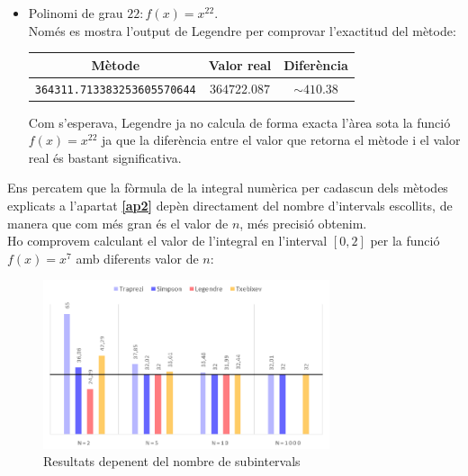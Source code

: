 \documentclass[12pt]{article}
\begin{document}
\begin{itemize}
     \item Polinomi de grau $22: f(x) = x^{22}$.\\
    Només es mostra l'output de Legendre per comprovar l'exactitud del mètode:
    
    \begin{table}[h]
            \begin{center}
            \begin{tabular}{ c | c | c }
            \textbf{Mètode} & \textbf{Valor real}  & \textbf{Diferència}\\ \hline
            \texttt{364311.713383253605570644} & $364722.087$ & $\sim410.38$\\ 
            \end{tabular}
            \end{center}
        \end{table}  
    

    
    Com s'esperava, Legendre ja no calcula de forma exacta l'àrea sota la funció $f(x)=x^{22}$ ja que la diferència entre el valor que retorna el mètode i el valor real és bastant significativa.  
    
\end{itemize}
\newpage
\hspace{-1.5em}Ens percatem que la fòrmula de la integral numèrica per cadascun dels mètodes explicats a l'apartat \textcolor{blue}{\textbf{\ref{ap2}}} depèn directament del nombre d'intervals escollits, de manera que com més gran és el valor de $n$, més precisió obtenim. \\
Ho comprovem calculant el valor de l'integral en l'interval $[0,2]$ per la funció $f(x) = x^7$ amb diferents valor de $n$:
\begin{figure}[h]
    \centering
    \includegraphics[width = 0.75\textwidth]{excelsupremacy.png}
    \caption{Resultats depenent del nombre de subintervals}
    \label{fig:my_label}
\end{figure}\\
\end{document}
